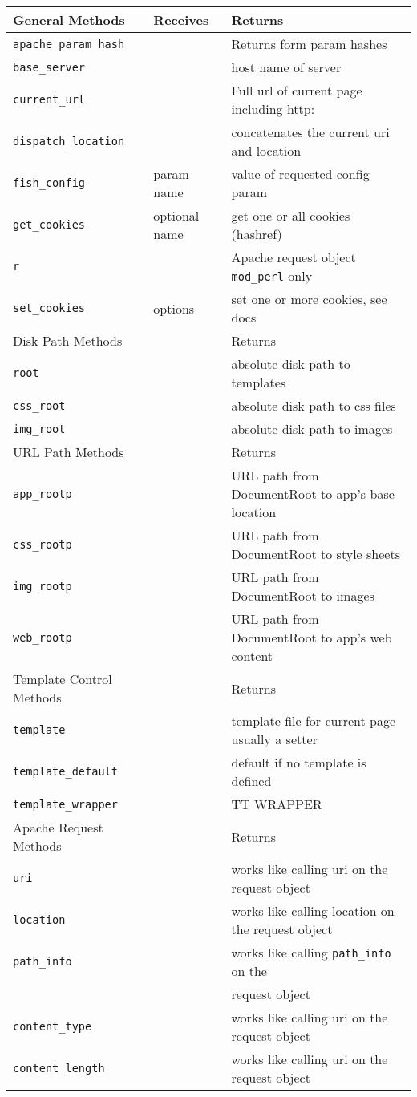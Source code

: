 \begin{tabular}{l|l|l}
General Methods    & Receives & Returns \\
\hline
\verb+apache_param_hash+ & & Returns form param hashes                  \\
\verb+base_server+       & & host name of server                        \\
\verb+current_url+       & & Full url of current page including http:   \\
\verb+dispatch_location+ & & concatenates the current uri and location  \\
\verb+fish_config+       & param name & value of requested config param \\
\verb+get_cookies+       & optional name & get one or all cookies (hashref) \\
\verb+r+                 & & Apache request object \verb+mod_perl+ only \\
\verb+set_cookies+       & options & set one or more cookies, see docs  \\
\hline
Disk Path Methods    & & Returns \\
\hline
\verb+root+      & & absolute disk path to templates \\
\verb+css_root+  & & absolute disk path to css files \\
\verb+img_root+  & & absolute disk path to images    \\
\hline
URL Path Methods    & & Returns \\
\hline
\verb+app_rootp+ & & URL path from DocumentRoot to app's base location \\
\verb+css_rootp+ & & URL path from DocumentRoot to style sheets        \\
\verb+img_rootp+ & & URL path from DocumentRoot to images              \\
\verb+web_rootp+ & & URL path from DocumentRoot to app's web content   \\
\hline
Template Control Methods    & & Returns \\
\hline
\verb+template+          & & template file for current page usually a setter \\
\verb+template_default+  & & default if no template is defined               \\
\verb+template_wrapper+  & & TT WRAPPER                                      \\
\hline
Apache Request Methods    & & Returns \\
\hline
\verb+uri+            & & works like calling uri on the request object      \\
\verb+location+       & & works like calling location on the request object \\
\verb+path_info+      & & works like calling \verb+path_info+ on the        \\
                      & & request object                                    \\
\verb+content_type+   & & works like calling uri on the request object      \\
\verb+content_length+ & & works like calling uri on the request object      \\
\end{tabular}

